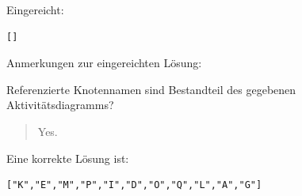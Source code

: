 Eingereicht:


\begin{verbatim}
[]
\end{verbatim}


Anmerkungen zur eingereichten Lösung:

Referenzierte Knotennamen sind Bestandteil des gegebenen Aktivitätsdiagramms?\begin{quote}Yes.\end{quote}Eine korrekte Lösung ist:
\begin{verbatim}
["K","E","M","P","I","D","O","Q","L","A","G"]
\end{verbatim}


